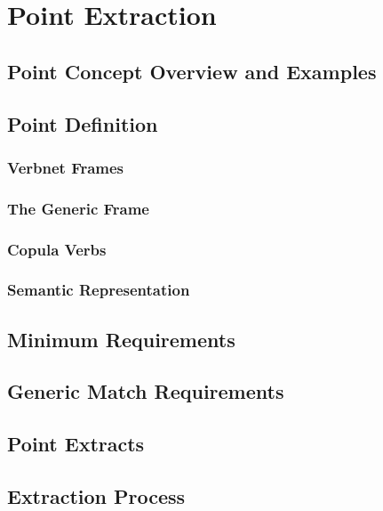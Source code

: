 \chapter{Point Extraction\label{chap:point-extraction}}
  \section{Point Concept Overview and Examples}
  \section{Point Definition}
    \subsection{Verbnet Frames}
    \subsection{The Generic Frame}
    \subsection{Copula Verbs}
    \subsection{Semantic Representation}
  \section{Minimum Requirements}
    \section{Generic Match Requirements}
  \section{Point Extracts}
  \section{Extraction Process}
